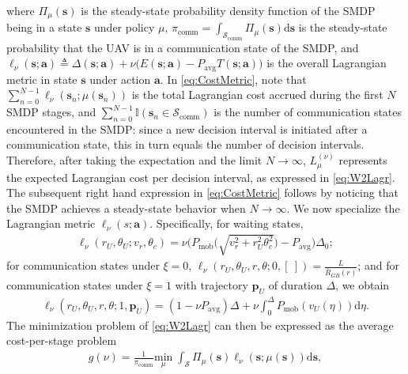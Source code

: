 \documentclass[10pt,twocolumn]{IEEEtran}
\begin{document}
where $\Pi_{\mu}(\mathbf{s})$ is the steady-state probability density function of the SMDP being in a state $\mathbf{s}$ under policy $\mu$, $\pi_{\mathrm{comm}}{=}\int_{\mathcal{S}_{\mathrm{comm}}}\!\!\!\!\!\Pi_{\mu}(\mathbf{s})\mathrm{d}\mathbf{s}$ is the steady-state probability that the UAV is in a communication state of the SMDP, and $\ell_{\nu}(\mathbf{s};\mathbf{a}){\triangleq}\Delta(\mathbf{s};\mathbf{a}){+}\nu\big(E(\mathbf{s};\mathbf{a}){-}P_{\mathrm{avg}}T(\mathbf{s};\mathbf{a})\big)$ is the overall Lagrangian metric in state $\mathbf{s}$ under action $\mathbf{a}$. In \eqref{eq:CostMetric}, note that $\sum_{n=0}^{N{-}1}\ell_{\nu}(\mathbf{s}_{n};\mu(\mathbf{s}_{n}))$ is the total Lagrangian cost accrued during the first $N$ SMDP stages, and $\sum_{n{=}0}^{N{-}1}\mathbb{I}(\mathbf{s}_{n}{\in}\mathcal{S}_{\mathrm{comm}})$ is the number of communication states encountered in the SMDP: since a new decision interval is initiated after a communication state, this in turn equals the number of decision intervals. Therefore, after taking the expectation and the limit $N{\to}\infty$, $L_{\mu}^{(\nu)}$ represents the expected Lagrangian cost per decision interval, as expressed in \eqref{eq:W2Lagr}. The subsequent right hand expression in \eqref{eq:CostMetric} follows by noticing that the SMDP achieves a steady-state behavior when $N\to\infty$. We now specialize the Lagrangian metric $\ell_{\nu}(s;\mathbf{a})$. Specifically, for waiting states,
\begin{align}\label{eq:EllWait}
    \ell_{\nu}(r_{U},\theta_{U};v_{r},\theta_{c}){=}\nu\Big(P_{\mathrm{mob}}\Big(\sqrt{v_{r}^{2}{+}r_{U}^{2}\theta_{c}^{2}}\Big){-}P_{\mathrm{avg}}\Big)\Delta_{0};
\end{align}
for communication states under $\xi{=}0$, $\ell_{\nu}(r_U,\theta_U,r,\theta;0,[\ ])=\frac{L}{\bar{R}_{GB}(r)}$; and for communication states under $\xi{=}1$ with trajectory 
$\mathbf{p}_{U}$ of duration $\Delta$, we obtain
\begin{align*}
    \ell_{\nu}(r_{U}{,}\theta_{U}{,}r{,}\theta{;}1{,}\mathbf{p}_{U}){=}(1{-}\nu P_{\mathrm{avg}})\Delta{+}\nu\int_{0}^{\Delta}P_{\mathrm{mob}}\left(v_{U}(\eta)\right)\mathrm{d}\eta.
\end{align*}
The minimization problem of \eqref{eq:W2Lagr} can then be expressed as the average cost-per-stage problem
\begin{align}\label{eq:TotalGMin}
	g(\nu) = \frac{1}{\pi_{\mathrm{comm}}}\underset{\mu}{\mathrm{min}} \; \int_{\mathcal{S}} \Pi_{\mu}(\mathbf{s}) 
	\ell_\nu(\mathbf{s}; \mu(\mathbf{s}))\mathrm d \mathbf{s},
\end{align}
\end{document}
